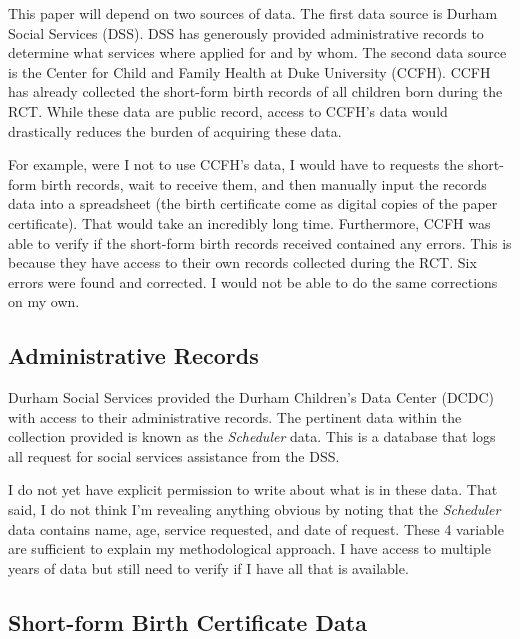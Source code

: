 \documentclass[12pt,letterpaperpaper,]{book}
\begin{document}
This paper will depend on two sources of data. The first data source is
Durham Social Services (DSS). DSS has generously provided administrative
records to determine what services where applied for and by whom. The
second data source is the Center for Child and Family Health at Duke
University (CCFH). CCFH has already collected the short-form birth
records of all children born during the RCT. While these data are public
record, access to CCFH's data would drastically reduces the burden of
acquiring these data.

For example, were I not to use CCFH's data, I would have to requests the
short-form birth records, wait to receive them, and then manually input
the records data into a spreadsheet (the birth certificate come as
digital copies of the paper certificate). That would take an incredibly
long time. Furthermore, CCFH was able to verify if the short-form birth
records received contained any errors. This is because they have access
to their own records collected during the RCT. Six errors were found and
corrected. I would not be able to do the same corrections on my own.

\subsection*{Administrative Records}\label{administrative-records}

Durham Social Services provided the Durham Children's Data Center (DCDC)
with access to their administrative records. The pertinent data within
the collection provided is known as the \emph{Scheduler} data. This is a
database that logs all request for social services assistance from the
DSS.

I do not yet have explicit permission to write about what is in these
data. That said, I do not think I'm revealing anything obvious by noting
that the \emph{Scheduler} data contains name, age, service requested,
and date of request. These 4 variable are sufficient to explain my
methodological approach. I have access to multiple years of data but
still need to verify if I have all that is available.

\subsection*{Short-form Birth Certificate
Data}\label{short-form-birth-certificate-data}
\end{document}
